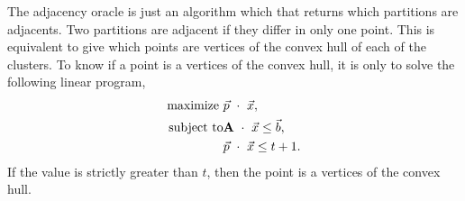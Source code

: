 \documentclass{article}
\begin{document}
The adjacency oracle is just an algorithm which that returns which
partitions are adjacents. Two partitions are adjacent if they differ
in only one point. This is equivalent to give which points are
vertices of the convex hull of each of the clusters. 
To know if a point is a vertices of the convex hull, it is only to 
solve the following linear program,
\begin{eqnarray*}
  \text{maximize }&\vec{p}\ \cdot \ \vec{x},\\
  \text{subject to}&\textbf{A}\ \cdot \ \vec{x}\le \vec{b},\\
  &\vec{p}\ \cdot \ \vec{x}\le t+1.\\
\end{eqnarray*}
If the value is strictly greater than $t$, then the point is a
vertices of the convex hull.


\end{document}
